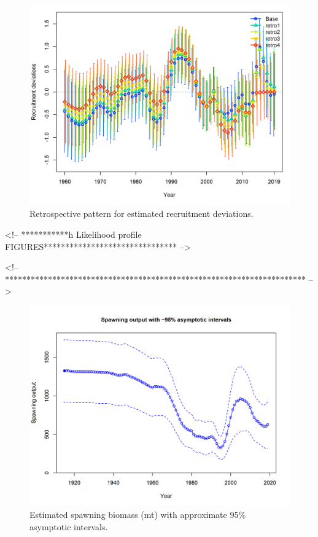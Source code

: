 \documentclass[12pt,]{article}
\begin{document}
\FloatBarrier

\begin{figure}
\centering
\includegraphics{Figures/retro_recdev.png}
\caption{Retrospective pattern for estimated recruitment deviations.
\label{fig:retro_recdev}}
\end{figure}

\FloatBarrier
<!-- ***********h Likelihood profile FIGURES******************************* -->

\FloatBarrier
<!-- ********************************************************************** -->

\begin{figure}
\centering
\includegraphics{r4ss/plots_mod1/ts7_Spawning_output_with_95_asymptotic_intervals_intervals.png}
\caption{Estimated spawning biomass (mt) with approximate 95\%
asymptotic intervals.
\label{fig:ts7_Spawning_biomass_(mt)_with_95_asymptotic_intervals_intervals}}
\end{figure}
\end{document}
